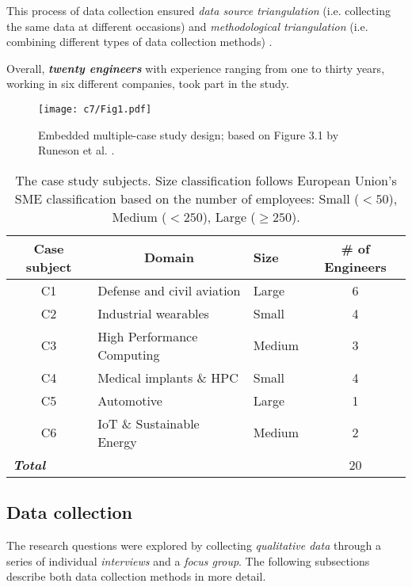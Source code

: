 This process of data collection ensured \textit{data source triangulation} (i.e. collecting the same data at different occasions) and \textit{methodological triangulation} (i.e. combining different types of data collection methods) \cite{Runeson2012}.

Overall, \textit{\textbf{twenty engineers}} with experience ranging from one to thirty years, working in six different companies, took part in the study.

\begin{figure}
    \centering
    \texttt{[image: c7/Fig1.pdf]}
    \caption{Embedded multiple-case study design; based on Figure 3.1 by Runeson et al. \cite{Runeson2012}.}
    \label{c7:fig:case-study-design}
\end{figure}

\begin{table}[tbp]
    \centering
   \footnotesize
    \caption{The case study subjects. Size classification follows European Union's SME classification based on the number of employees: Small ($< 50$), Medium ($< 250$), Large ($\ge 250$).}
    \label{c7:tab:case-study-subjects}
    \begin{tabular}{@{}cllc@{}}
    \toprule
    \multicolumn{1}{c}{\textbf{Case subject}} & \multicolumn{1}{c}{\textbf{Domain}} & \textbf{Size} & \textbf{\# of Engineers} \\ \midrule
    C1 & Defense and civil aviation & Large & 6 \\
    C2 & Industrial wearables & Small & 4 \\
    C3 & High Performance Computing & Medium & 3 \\
    C4 & Medical implants \& HPC & Small & 4 \\
    C5 & Automotive & Large & 1 \\
    C6 & IoT \& Sustainable Energy & Medium & 2 \\\midrule
    \multicolumn{3}{l}{\textit{\textbf{Total}}} & 20 \\\bottomrule
    \end{tabular}
\end{table}

\subsection{Data collection}
The research questions were explored by collecting \textit{qualitative data} through a series of individual \textit{interviews} and a \textit{focus group}. 
The following subsections describe both data collection methods in more detail.

